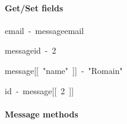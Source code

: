 \documentclass[10pt,twocolumn,a4paper]{article}
\newenvironment{Hinput}%
{}%
{}%
\newenvironment{Hchunk}%
{\vspace{0.5em}\par\begin{flushleft}}%
{\end{flushleft}}%
\newcommand{\hlnumber}[1]{\textcolor[rgb]{0.0823529411764706,0.0784313725490196,0.709803921568627}{#1}}%
\newcommand{\hlstring}[1]{\textcolor[rgb]{0.6,0.6,1}{#1}}%
\newcommand{\hlkeyword}[1]{\textcolor[rgb]{0,0,0}{#1}}%
\newcommand{\hlassignement}[1]{\textcolor[rgb]{0.215686274509804,0.215686274509804,0.384313725490196}{#1}}%
\newcommand{\hlsymbol}[1]{\textcolor[rgb]{0,0,0}{#1}}%
\newcommand{\hlprompt}[1]{\textcolor[rgb]{0,0,0}{#1}}%
\begin{document}
\paragraph{Get/Set fields}

\begin{Hchunk}
\begin{normalsize}
\begin{Hinput}

\ttfamily\noindent
\hlprompt{\usebox{\hlnormalsizeboxgreaterthan}{\ }}\hlsymbol{email}{\ }\hlassignement{\usebox{\hlnormalsizeboxlessthan}-}{\ }\hlsymbol{message}\hlkeyword{\usebox{\hlnormalsizeboxdollar}}\hlsymbol{email}\mbox{}
\normalfont

\end{Hinput}


\begin{Hinput}

\ttfamily\noindent
\hlprompt{\usebox{\hlnormalsizeboxgreaterthan}{\ }}\hlsymbol{message}\hlkeyword{\usebox{\hlnormalsizeboxdollar}}\hlsymbol{id}{\ }\hlassignement{\usebox{\hlnormalsizeboxlessthan}-}{\ }\hlnumber{2}\mbox{}
\normalfont

\end{Hinput}


\begin{Hinput}

\ttfamily\noindent
\hlprompt{\usebox{\hlnormalsizeboxgreaterthan}{\ }}\hlsymbol{message}\hlkeyword{[[}{\ }\hlstring{"{}name"{}}{\ }\hlkeyword{]}\hlkeyword{]}{\ }\hlassignement{\usebox{\hlnormalsizeboxlessthan}-}{\ }\hlstring{"{}Romain"{}}\mbox{}
\normalfont

\end{Hinput}


\begin{Hinput}

\ttfamily\noindent
\hlprompt{\usebox{\hlnormalsizeboxgreaterthan}{\ }}\hlsymbol{id}{\ }\hlassignement{\usebox{\hlnormalsizeboxlessthan}-}{\ }\hlsymbol{message}\hlkeyword{[[}{\ }\hlnumber{2}{\ }\hlkeyword{]}\hlkeyword{]}\mbox{}
\normalfont

\end{Hinput}


\end{normalsize}
\end{Hchunk}


\paragraph{Message methods}
\end{document}
